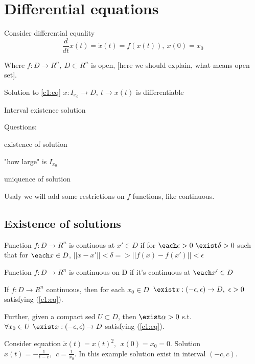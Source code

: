 \section{Differential equations}

Consider differential equality
\begin{equation}\label{c1:eq}
\frac{d}{dt}x(t)=\dot x(t)=f(x(t)), \ x(0)=x_0 
\end{equation}

Where $f:D\rightarrow R^n, \ D\subset R^n$ is open, [here we should explain,
what means open set].

Solution to \ref{c1:eq} $x:I_{x_0} \rightarrow D, \ t\rightarrow x(t)$ is
differentiable

Interval existence solution

Questions:

\begin{itemize}[\label=#]
\item existence of solution
\item "how large" is $I_{x_0}$
\item uniquence of solution
\end{itemize}


Usaly we will add some restrictions on $f$ functions, like continuous.

\subsection{Existence of solutions}

Function $f:D \rightarrow R^n$ is contiuous at $x' \in D$ if for
$\each \epsilon > 0 \ \exist \delta>0$ such that for $\each x \in D$,
$||x-x'||<\delta => ||f(x)-f(x')|| < \epsilon$

Function $f:D \rightarrow R^n$ is continuous on D if it's 
continuous at $\each x' \in D$

If $f:D \rightarrow R^n$ continuous, then for each $x_0 \in D$\ 
$\exist x:(-\epsilon,\epsilon) \rightarrow D, \ \epsilon > 0$
satisfying (\ref{c1:eq}).

Further, given a compact sed $U \subset D$, then 
$\exist \alpha > 0$ s.t. $\forall x_0 \in U 
\ \exist x:(-\epsilon,\epsilon) \rightarrow D$ satisfying (\ref{c1:eq}).


Consider equation $\dot x(t) = x(t)^2, \ \ x(0)=x_0=0$. Solution 
$x(t)=-\frac{1}{t-c}, \ \ c=\frac{1}{x_0}$. In this example
solution exist in interval $(-c, c)$.


